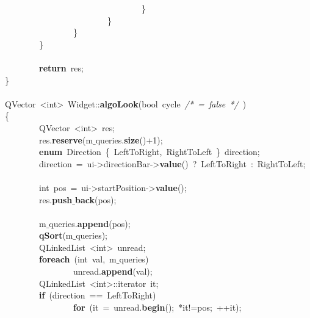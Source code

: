 \mbox{}\ \ \ \ \ \ \ \ \ \ \ \ \ \ \ \ \ \ \ \ \ \ \ \ \ \ \ \ \ \ \ \ \} \\
\mbox{}\ \ \ \ \ \ \ \ \ \ \ \ \ \ \ \ \ \ \ \ \ \ \ \ \} \\
\mbox{}\ \ \ \ \ \ \ \ \ \ \ \ \ \ \ \ \} \\
\mbox{}\ \ \ \ \ \ \ \ \} \\
\mbox{} \\
\mbox{}\ \ \ \ \ \ \ \ \textbf{return}\ res; \\
\mbox{}\} \\
\mbox{} \\
\mbox{}QVector\ \textless{}int\textgreater{}\ Widget::\textbf{algoLook}(bool\ cycle\ \textit{/*\ =\ false\ */}\ ) \\
\mbox{}\{ \\
\mbox{}\ \ \ \ \ \ \ \ QVector\ \textless{}int\textgreater{}\ res; \\
\mbox{}\ \ \ \ \ \ \ \ res.\textbf{reserve}(m$\_$queries.\textbf{size}()+1); \\
\mbox{}\ \ \ \ \ \ \ \ \textbf{enum}\ Direction\ \{\ LeftToRight,\ RightToLeft\ \}\ direction; \\
\mbox{}\ \ \ \ \ \ \ \ direction\ =\ ui-\textgreater{}directionBar-\textgreater{}\textbf{value}()\ ?\ LeftToRight\ :\ RightToLeft; \\
\mbox{} \\
\mbox{}\ \ \ \ \ \ \ \ int\ pos\ =\ ui-\textgreater{}startPosition-\textgreater{}\textbf{value}(); \\
\mbox{}\ \ \ \ \ \ \ \ res.\textbf{push$\_$back}(pos); \\
\mbox{} \\
\mbox{}\ \ \ \ \ \ \ \ m$\_$queries.\textbf{append}(pos); \\
\mbox{}\ \ \ \ \ \ \ \ \textbf{qSort}(m$\_$queries); \\
\mbox{}\ \ \ \ \ \ \ \ QLinkedList\ \textless{}int\textgreater{}\ unread; \\
\mbox{}\ \ \ \ \ \ \ \ \textbf{foreach}\ (int\ val,\ m$\_$queries) \\
\mbox{}\ \ \ \ \ \ \ \ \ \ \ \ \ \ \ \ unread.\textbf{append}(val); \\
\mbox{}\ \ \ \ \ \ \ \ QLinkedList\ \textless{}int\textgreater{}::iterator\ it; \\
\mbox{}\ \ \ \ \ \ \ \ \textbf{if}\ (direction\ ==\ LeftToRight) \\
\mbox{}\ \ \ \ \ \ \ \ \ \ \ \ \ \ \ \ \textbf{for}\ (it\ =\ unread.\textbf{begin}();\ *it!=pos;\ ++it); \\
